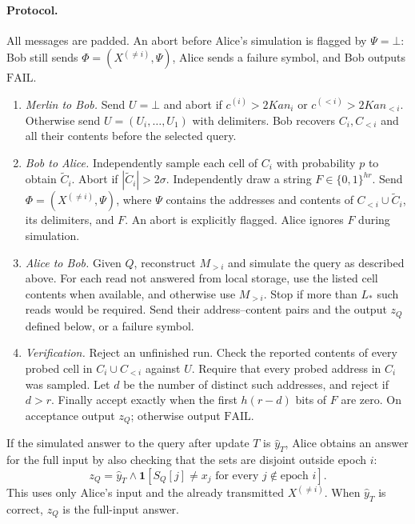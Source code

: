 \documentclass[11pt]{article}
\newcounter{Protocol}
\theoremstyle{plain}
\newcommand{\FAIL}{\mathrm{FAIL}}
\begin{document}
\paragraph{Protocol.}
All messages are padded. An abort before Alice's simulation is flagged
by $\Psi=\bot$: Bob still sends $\Phi=(X^{(\ne i)},\Psi)$, Alice
sends a failure symbol, and Bob outputs $\FAIL$.
\begin{enumerate}[leftmargin=*,label=\arabic*.]
\item \emph{Merlin to Bob.} Send $U=\bot$ and abort if
$c^{(i)}>2Ka n_i$ or $c^{(<i)}>2Ka n_{<i}$.
Otherwise send $U=(U_i,\ldots,U_1)$ with delimiters. Bob recovers
$C_i,C_{<i}$ and all their contents before the selected query.
\item \emph{Bob to Alice.} Independently sample each cell of $C_i$
with probability $p$ to obtain $\widetilde C_i$. Abort if
$|\widetilde C_i|>2\sigma$. Independently draw a string
$F\in\{0,1\}^{hr}$. Send
$\Phi=(X^{(\ne i)},\Psi)$, where $\Psi$ contains the addresses and
contents of $C_{<i}\cup\widetilde C_i$, its delimiters, and $F$.
An abort is explicitly flagged. Alice ignores $F$ during simulation.
\item \emph{Alice to Bob.} Given $Q$, reconstruct $M_{>i}$ and simulate
the query as described above. For each read not answered from local
storage, use the listed cell contents when available, and otherwise
use $M_{>i}$. Stop if more than $L_*$ such reads would be required.
Send their address--content pairs and the output $z_Q$ defined below,
or a failure symbol.
\item \emph{Verification.} Reject an unfinished run.
Check the reported contents of every probed cell in $C_i\cup C_{<i}$
against $U$. Require that every probed address in $C_i$ was sampled.
Let $d$ be the number of distinct such addresses, and reject if $d>r$.
Finally accept exactly when the first $h(r-d)$ bits of $F$ are zero.
On acceptance output $z_Q$; otherwise output $\FAIL$.
\end{enumerate}

If the simulated answer to the query after update $T$ is $\widehat y_T$, Alice obtains an
answer for the full input by also checking that the sets are disjoint outside epoch $i$:
\begin{equation}\label{eq:disj-filter}
 z_Q=\widehat y_T\wedge
 \mathbf1[S_Q[j]\ne x_j\text{ for every }j\notin\text{epoch }i].
\end{equation}
This uses only Alice's input and the already transmitted $X^{(\ne i)}$.
When $\widehat y_T$ is correct, $z_Q$ is the full-input answer.
\end{document}
